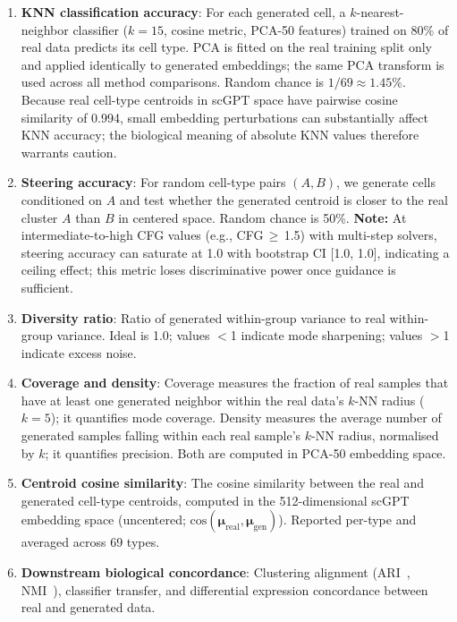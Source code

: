 \documentclass[preprint,12pt]{elsarticle}
\begin{document}
\begin{enumerate}
\item \textbf{KNN classification accuracy}: For each generated cell, a $k$-nearest-neighbor classifier ($k{=}15$, cosine metric, PCA-50 features) trained on 80\% of real data predicts its cell type. PCA is fitted on the real training split only and applied identically to generated embeddings; the same PCA transform is used across all method comparisons. Random chance is $1/69 \approx 1.45\%$. Because real cell-type centroids in scGPT space have pairwise cosine similarity of 0.994, small embedding perturbations can substantially affect KNN accuracy; the biological meaning of absolute KNN values therefore warrants caution.
\item \textbf{Steering accuracy}: For random cell-type pairs $(A, B)$, we generate cells conditioned on $A$ and test whether the generated centroid is closer to the real cluster $A$ than $B$ in centered space. Random chance is 50\%. \textbf{Note:} At intermediate-to-high CFG values (e.g., CFG$\,\geq\,$1.5) with multi-step solvers, steering accuracy can saturate at 1.0 with bootstrap CI [1.0, 1.0], indicating a ceiling effect; this metric loses discriminative power once guidance is sufficient.
\item \textbf{Diversity ratio}: Ratio of generated within-group variance to real within-group variance. Ideal is 1.0; values $<$1 indicate mode sharpening; values $>$1 indicate excess noise.
\item \textbf{Coverage and density}: Coverage measures the fraction of real samples that have at least one generated neighbor within the real data's $k$-NN radius ($k{=}5$); it quantifies mode coverage. Density measures the average number of generated samples falling within each real sample's $k$-NN radius, normalised by $k$; it quantifies precision. Both are computed in PCA-50 embedding space.
\item \textbf{Centroid cosine similarity}: The cosine similarity between the real and generated cell-type centroids, computed in the 512-dimensional scGPT embedding space (uncentered; $\text{cos}(\boldsymbol{\mu}_\text{real}, \boldsymbol{\mu}_\text{gen})$). Reported per-type and averaged across 69 types.
\item \textbf{Downstream biological concordance}: Clustering alignment (ARI~\cite{ref-ari}, NMI~\cite{ref-nmi}), classifier transfer, and differential expression concordance between real and generated data.
\end{enumerate}
\end{document}
